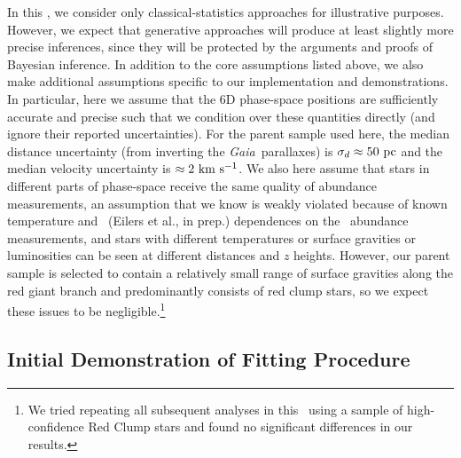 \documentclass[modern]{aastex63}
\newcommand{\gaia}{\textsl{Gaia}}
\newcommand{\apogee}{\acronym{APOGEE}}
\begin{document}
In this \documentname, we consider only classical-statistics approaches for
illustrative purposes.%
However, we expect that generative approaches will produce at least slightly
more precise inferences, since they will be protected by the arguments and
proofs of Bayesian inference.
In addition to the core assumptions listed above, we also make additional
assumptions specific to our implementation and demonstrations.
In particular, here we assume that the 6D phase-space positions are sufficiently
accurate and precise such that we condition over these quantities directly (and
ignore their reported uncertainties).
For the parent sample used here, the median distance uncertainty (from inverting
the \gaia\ parallaxes) is $\sigma_d \approx 50~\mathrm{pc}$ and the median velocity
uncertainty is $\approx 2~\mathrm{km}~\mathrm{s}^{-1}$.
We also here assume that stars in different parts of phase-space receive the
same quality of abundance measurements, an assumption that we know is weakly
violated because of known temperature \citep{Jonsson:2020} and \logg\ (Eilers et
al., in prep.) dependences on the \apogee\ abundance measurements, and stars
with different temperatures or surface gravities or luminosities can be seen at
different distances and $z$ heights.
However, our parent sample is selected to contain a relatively small range of
surface gravities along the red giant branch and predominantly consists of
red clump stars, so we expect these issues to be negligible.\footnote{We tried
repeating all subsequent analyses in this \documentname\ using a sample of
high-confidence Red Clump stars \citep[using the selection defined
in][]{Bovy:2014} and found no significant differences in our results.}

\subsection{Initial Demonstration of Fitting Procedure}
\end{document}
